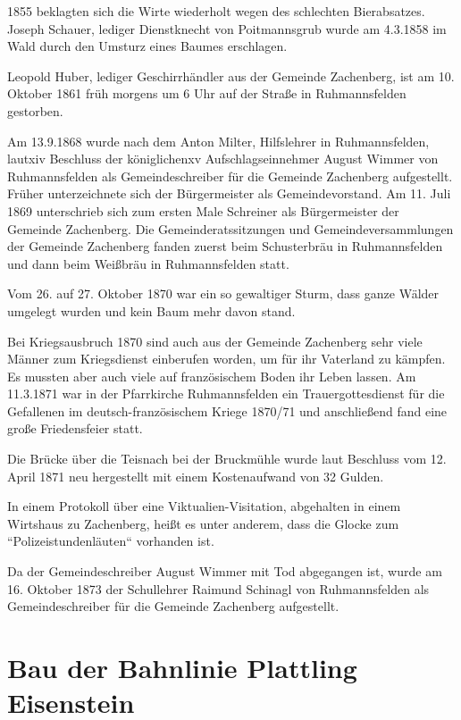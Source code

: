 \documentclass[12pt,a4pager]{book}
\begin{document}
1855 beklagten sich die Wirte wiederholt wegen des schlechten Bierabsatzes.
Joseph Schauer, lediger Dienstknecht von Poitmannsgrub wurde am 4.3.1858 im Wald
durch den Umsturz eines Baumes erschlagen.

Leopold Huber, lediger Geschirrhändler aus der Gemeinde Zachenberg, ist am 10.
Oktober 1861 früh morgens um 6 Uhr auf der Straße in Ruhmannsfelden gestorben.

Am 13.9.1868 wurde nach dem Anton Milter, Hilfslehrer in Ruhmannsfelden, lautxiv
Beschluss der königlichenxv Aufschlagseinnehmer August Wimmer von Ruhmannsfelden
als Gemeindeschreiber für die Gemeinde Zachenberg aufgestellt. Früher
unterzeichnete sich der Bürgermeister als Gemeindevorstand. Am 11. Juli 1869
unterschrieb sich zum ersten Male Schreiner als Bürgermeister der Gemeinde
Zachenberg. Die Gemeinderatssitzungen und Gemeindeversammlungen der Gemeinde
Zachenberg fanden zuerst beim Schusterbräu in Ruhmannsfelden und dann beim
Weißbräu in Ruhmannsfelden statt.

Vom 26. auf 27. Oktober 1870 war ein so gewaltiger Sturm, dass ganze Wälder
umgelegt wurden und kein Baum mehr davon stand.

Bei Kriegsausbruch 1870 sind auch aus der Gemeinde Zachenberg sehr viele Männer
zum Kriegsdienst einberufen worden, um für ihr Vaterland zu kämpfen. Es mussten
aber auch viele auf französischem Boden ihr Leben lassen. Am 11.3.1871 war in
der Pfarrkirche Ruhmannsfelden ein Trauergottesdienst für die Gefallenen im
deutsch-französischem Kriege 1870/71 und anschließend fand eine große
Friedensfeier statt.

Die Brücke über die Teisnach bei der Bruckmühle wurde laut Beschluss vom 12.
April 1871 neu hergestellt mit einem Kostenaufwand von 32 Gulden.

In einem Protokoll über eine Viktualien-Visitation, abgehalten in einem
Wirtshaus zu Zachenberg, heißt es unter anderem, dass die Glocke zum
“Polizeistundenläuten“ vorhanden ist.

Da der Gemeindeschreiber August Wimmer mit Tod abgegangen ist, wurde am 16.
Oktober 1873 der Schullehrer Raimund Schinagl von Ruhmannsfelden als
Gemeindeschreiber für die Gemeinde Zachenberg aufgestellt.

\section{Bau der Bahnlinie Plattling Eisenstein}
\end{document}
